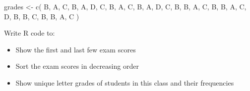 \documentclass[
  letterpaper,
  DIV=11,
  numbers=noendperiod]{scrreprt}
\newenvironment{Shaded}{\begin{snugshade}}{\end{snugshade}}
\newcommand{\FunctionTok}[1]{\textcolor[rgb]{0.28,0.35,0.67}{#1}}
\newcommand{\NormalTok}[1]{\textcolor[rgb]{0.00,0.23,0.31}{#1}}
\newcommand{\OtherTok}[1]{\textcolor[rgb]{0.00,0.23,0.31}{#1}}
\newcommand{\StringTok}[1]{\textcolor[rgb]{0.13,0.47,0.30}{#1}}
\begin{document}
\begin{Shaded}
\begin{Highlighting}[]
\NormalTok{grades }\OtherTok{\textless{}{-}} \FunctionTok{c}\NormalTok{(}
  \StringTok{\textquotesingle{}B\textquotesingle{}}\NormalTok{, }\StringTok{\textquotesingle{}A\textquotesingle{}}\NormalTok{, }\StringTok{\textquotesingle{}C\textquotesingle{}}\NormalTok{, }\StringTok{\textquotesingle{}B\textquotesingle{}}\NormalTok{, }\StringTok{\textquotesingle{}A\textquotesingle{}}\NormalTok{, }\StringTok{\textquotesingle{}D\textquotesingle{}}\NormalTok{, }\StringTok{\textquotesingle{}C\textquotesingle{}}\NormalTok{, }\StringTok{\textquotesingle{}B\textquotesingle{}}\NormalTok{, }\StringTok{\textquotesingle{}A\textquotesingle{}}\NormalTok{, }\StringTok{\textquotesingle{}C\textquotesingle{}}\NormalTok{,}
  \StringTok{\textquotesingle{}B\textquotesingle{}}\NormalTok{, }\StringTok{\textquotesingle{}A\textquotesingle{}}\NormalTok{, }\StringTok{\textquotesingle{}D\textquotesingle{}}\NormalTok{, }\StringTok{\textquotesingle{}C\textquotesingle{}}\NormalTok{, }\StringTok{\textquotesingle{}B\textquotesingle{}}\NormalTok{, }\StringTok{\textquotesingle{}B\textquotesingle{}}\NormalTok{, }\StringTok{\textquotesingle{}A\textquotesingle{}}\NormalTok{, }\StringTok{\textquotesingle{}C\textquotesingle{}}\NormalTok{, }\StringTok{\textquotesingle{}B\textquotesingle{}}\NormalTok{, }\StringTok{\textquotesingle{}B\textquotesingle{}}\NormalTok{,}
  \StringTok{\textquotesingle{}A\textquotesingle{}}\NormalTok{, }\StringTok{\textquotesingle{}C\textquotesingle{}}\NormalTok{, }\StringTok{\textquotesingle{}D\textquotesingle{}}\NormalTok{, }\StringTok{\textquotesingle{}B\textquotesingle{}}\NormalTok{, }\StringTok{\textquotesingle{}B\textquotesingle{}}\NormalTok{, }\StringTok{\textquotesingle{}C\textquotesingle{}}\NormalTok{, }\StringTok{\textquotesingle{}B\textquotesingle{}}\NormalTok{, }\StringTok{\textquotesingle{}B\textquotesingle{}}\NormalTok{, }\StringTok{\textquotesingle{}A\textquotesingle{}}\NormalTok{, }\StringTok{\textquotesingle{}C\textquotesingle{}}
\NormalTok{)}
\end{Highlighting}
\end{Shaded}

Write R code to:

\begin{itemize}
\item
  Show the first and last few exam scores
\item
  Sort the exam scores in decreasing order
\item
  Show unique letter grades of students in this class and their
  frequencies
\end{itemize}
\end{document}
